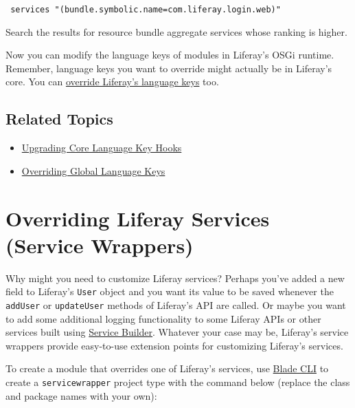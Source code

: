 \begin{verbatim}
 services "(bundle.symbolic.name=com.liferay.login.web)"
\end{verbatim}

Search the results for resource bundle aggregate services whose ranking
is higher.

\noindent\hrulefill

Now you can modify the language keys of modules in Liferay's OSGi
runtime. Remember, language keys you want to override might actually be
in Liferay's core. You can
\href{/docs/7-2/customization/-/knowledge_base/c/overriding-language-keys}{override
Liferay's language keys} too.

\section{Related Topics}\label{related-topics-26}

\begin{itemize}
\tightlist
\item
  \href{/docs/7-2/tutorials/-/knowledge_base/t/upgrading-core-language-key-hooks}{Upgrading
  Core Language Key Hooks}
\item
  \href{/docs/7-2/customization/-/knowledge_base/c/overriding-global-language-keys}{Overriding
  Global Language Keys}
\end{itemize}

\chapter{Overriding Liferay Services (Service
Wrappers)}\label{overriding-liferay-services-service-wrappers}

Why might you need to customize Liferay services? Perhaps you've added a
new field to Liferay's \texttt{User} object and you want its value to be
saved whenever the \texttt{addUser} or \texttt{updateUser} methods of
Liferay's API are called. Or maybe you want to add some additional
logging functionality to some Liferay APIs or other services built using
\href{/docs/7-2/appdev/-/knowledge_base/a/service-builder}{Service
Builder}. Whatever your case may be, Liferay's service wrappers provide
easy-to-use extension points for customizing Liferay's services.

To create a module that overrides one of Liferay's services, use
\href{/docs/7-2/reference/-/knowledge_base/r/blade-cli}{Blade CLI} to
create a \texttt{servicewrapper} project type with the command below
(replace the class and package names with your own):

